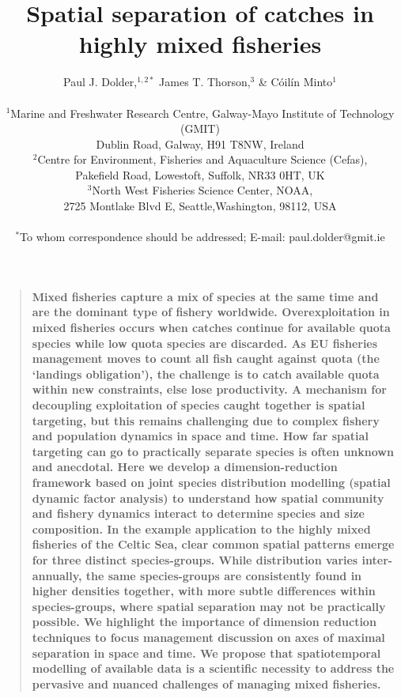 \documentclass[12pt]{article}
\title{Spatial separation of catches in highly mixed fisheries}
\author
{Paul J. Dolder,$^{1,2\ast}$ James T. Thorson,$^3$ \& Cóilín Minto$^1$\\
\\
\normalsize{$^1$Marine and Freshwater Research Centre, Galway-Mayo Institute of
	Technology (GMIT)}\\
\normalsize{Dublin Road, Galway, H91 T8NW, Ireland}\\
\normalsize{$^2$Centre for Environment, Fisheries and Aquaculture Science
	(Cefas),}\\
\normalsize{Pakefield Road, Lowestoft, Suffolk, NR33 0HT, UK}\\
\normalsize{$^3$North West Fisheries Science Center, NOAA,}\\
\normalsize{2725 Montlake Blvd E, Seattle,Washington, 98112, USA}\\
\\
\normalsize{$^\ast$To whom correspondence should be addressed; E-mail:
	paul.dolder@gmit.ie}
}
\date{}
\newenvironment{sciabstract}{%
\begin{quote} \bf}
{\end{quote}}
\begin{document}
\baselineskip24pt

\maketitle

\begin{linenumbers}

\begin{sciabstract}
Mixed fisheries capture a mix of species at the same time and are the dominant
type of fishery worldwide.  Overexploitation in mixed fisheries occurs when
catches continue for available quota species while low quota species are
discarded. As EU fisheries management moves to count all fish
caught against quota (the `landings obligation'), the challenge is to catch
available quota within new constraints, else lose productivity.  
A mechanism for decoupling exploitation of species caught together is spatial
targeting, but this remains challenging due to complex fishery and population
dynamics in space and time. 
How far spatial targeting can go to practically separate species is often
unknown and anecdotal.
Here we develop a dimension-reduction framework based on joint species
distribution modelling (spatial dynamic factor analysis) to understand how
spatial community and fishery dynamics interact to determine species and size
composition.  
In the example application to the highly mixed fisheries of the Celtic Sea,
clear common spatial patterns emerge for three distinct species-groups. While
distribution varies inter-annually, the same species-groups are consistently
found in higher densities together, with more subtle differences within
species-groups, where spatial separation may not be practically possible.
We highlight the importance of dimension reduction techniques to focus
management discussion on axes of maximal separation in space and time. We
propose that spatiotemporal modelling of available data is a scientific
necessity to address the pervasive and nuanced challenges of managing mixed
fisheries.  
\end{sciabstract}


\end{linenumbers}
\end{document}
